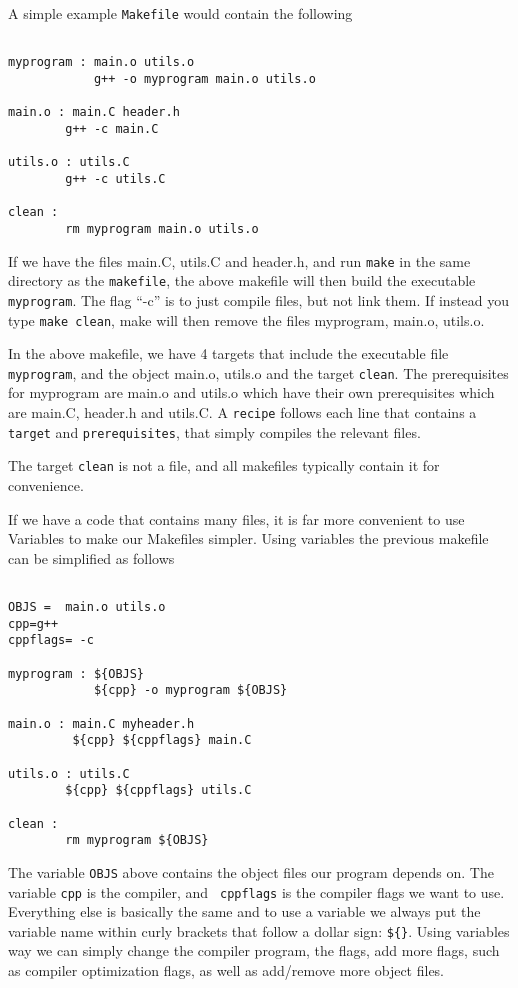\documentclass[aps,showpacs,prd,notitlepage,preprintnumbers,amsmath,amssymb,letterpaper]{revtex4}
\begin{document}
A simple example {\tt Makefile} would contain the following
\begin{verbatim}

myprogram : main.o utils.o
            g++ -o myprogram main.o utils.o

main.o : main.C header.h
        g++ -c main.C

utils.o : utils.C
        g++ -c utils.C

clean :
        rm myprogram main.o utils.o

\end{verbatim}

If we have the files main.C, utils.C and header.h, and run {\tt make}
in the same directory as the {\tt makefile}, the above makefile will
then build the executable {\tt myprogram}. The flag ``-c'' is to just
compile files, but not link them. If instead you type {\tt make clean},
make will then remove the files myprogram, main.o, utils.o.

In the above makefile, we have 4 targets that include the executable
file {\tt myprogram}, and the object main.o, utils.o and the target
{\tt clean}. The prerequisites for myprogram are main.o and utils.o
which have their own prerequisites which are main.C, header.h and
utils.C. A {\tt recipe} follows each line that contains a {\tt target}
and {\tt prerequisites}, that simply compiles the relevant files.

The target {\tt clean} is not a file, and all makefiles typically contain
it for convenience.

If we have a code that contains many files, it is far more convenient
to use Variables to make our Makefiles simpler. Using variables the previous
makefile can be simplified as follows
\begin{verbatim}

OBJS =  main.o utils.o
cpp=g++
cppflags= -c

myprogram : ${OBJS}
            ${cpp} -o myprogram ${OBJS}

main.o : main.C myheader.h
         ${cpp} ${cppflags} main.C 

utils.o : utils.C
        ${cpp} ${cppflags} utils.C

clean :
        rm myprogram ${OBJS}

\end{verbatim}

The variable {\tt OBJS} above contains the object files our program
depends on.  The variable {\tt cpp} is the compiler, and {\tt
  cppflags} is the compiler flags we want to use. Everything else is
basically the same and to use a variable we always put the variable
name within curly brackets that follow a dollar sign: {\tt \$\{\}}. Using
variables way we can simply change the compiler program, the flags,
add more flags, such as compiler optimization flags, as well as
add/remove more object files.
\end{document}
